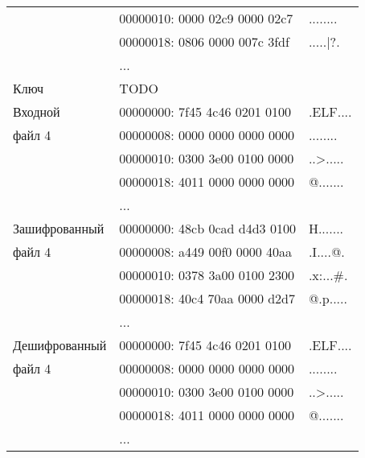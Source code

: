 \begin{table}[ht!]
\begin{center}
\begin{tabular}{|l|ll|}
                          & 00000010: 0000 02c9 0000 02c7 & ........ \\
                          & 00000018: 0806 0000 007c 3fdf & .....|?. \\
                          & ... & \\
            \hline
            \hline
            Ключ          & TODO & \\
            \hline
            Входной       & 00000000: 7f45 4c46 0201 0100 & .ELF.... \\
            файл 4        & 00000008: 0000 0000 0000 0000 & ........ \\
                          & 00000010: 0300 3e00 0100 0000 & ..>..... \\
                          & 00000018: 4011 0000 0000 0000 & @....... \\
                          & ... & \\
            \hline
            Зашифрованный & 00000000: 48cb 0cad d4d3 0100 & H....... \\
            файл 4        & 00000008: a449 00f0 0000 40aa & .I....@. \\
                          & 00000010: 0378 3a00 0100 2300 & .x:...\#. \\
                          & 00000018: 40c4 70aa 0000 d2d7 & @.p..... \\
                          & ... & \\
            \hline
            Дешифрованный & 00000000: 7f45 4c46 0201 0100 & .ELF.... \\
            файл 4        & 00000008: 0000 0000 0000 0000 & ........ \\
                          & 00000010: 0300 3e00 0100 0000 & ..>..... \\
                          & 00000018: 4011 0000 0000 0000 & @....... \\
                          & ... & \\
            \hline
        \end{tabular}
    \end{center}
\end{table}

